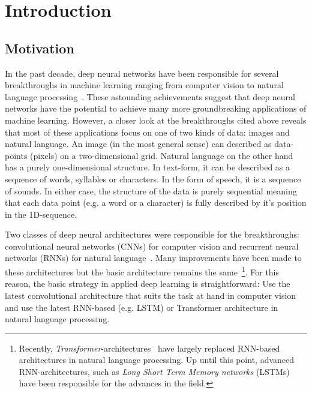\chapter{Introduction}
\label{chapter:Introduction}




\section{Motivation}

In the past decade, deep neural networks have been responsible for several breakthroughs in machine learning ranging from computer vision to natural language processing~\cite{Goodfellow-et-al-2016}. These astounding achievements suggest that deep neural networks have the potential to achieve many more groundbreaking applications of machine learning. However, a closer look at the breakthroughs cited above reveals that most of these applications focus on one of two kinds of data: images and natural language. An image (in the most general sense) can described as data-points (pixels) on a two-dimensional grid. Natural language on the other hand has a purely one-dimensional structure. In text-form, it can be described as a sequence of words, syllables or characters. In the form of speech, it is a sequence of sounds. In either case, the structure of the data is purely sequential meaning that each data point (e.g. a word or a character) is fully described by it's position in the 1D-sequence.

Two classes of deep neural architectures were responsible for the breakthroughs: convolutional neural networks (CNNs) for computer vision and recurrent neural networks (RNNs) for natural language~\cite{Goodfellow-et-al-2016}. Many improvements have been made to these architectures but the basic architecture remains the same~\footnote{Recently, \textit{Transformer}-architectures~\cite{Vaswani2017} have largely replaced RNN-based architectures in natural language processing. Up until this point, advanced RNN-architectures, such as \textit{Long Short Term Memory networks} (LSTMs)~\cite{Hochreiter1997} have been responsible for the advances in the field.}. For this reason, the basic strategy in applied deep learning is straightforward: Use the latest convolutional architecture that suits the task at hand in computer vision and use the latest RNN-based (e.g. LSTM) or Transformer architecture in natural language processing.

